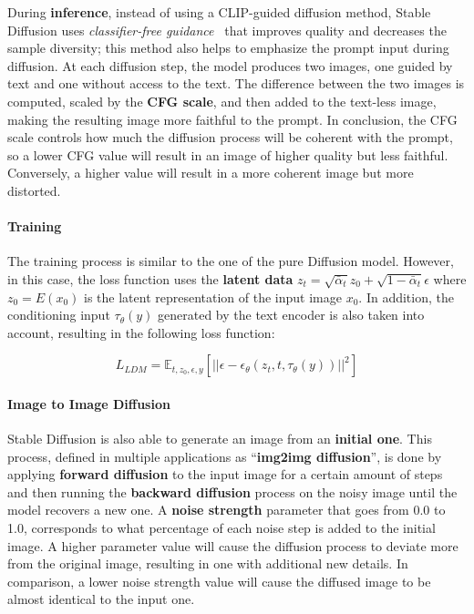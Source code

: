 \documentclass[preprint]{elsarticle}
\begin{document}
During \textbf{inference}, instead of using a CLIP-guided diffusion method, Stable Diffusion uses 
\emph{classifier-free guidance}~\cite{ho2022classifierfree} that improves quality and decreases the sample diversity;  this method also helps to emphasize the prompt input during diffusion. 
At each diffusion step, the model produces two images, one guided by text and one without access to the text.  The difference between the two images is computed, scaled by the \textbf{CFG scale}, and then added to the text-less image,  making the resulting image more faithful to the prompt. 
In conclusion, the CFG scale controls how much the diffusion process will be coherent with the prompt, so a lower CFG value will result in an image of higher quality but less faithful. Conversely, a higher value will result in a more coherent image but more distorted.


\paragraph{Training}

The training process is similar to the one of the pure Diffusion model.
However, in this case, the loss function uses the \textbf{latent data} $z_t=\sqrt{\bar{\alpha}_t}z_0 + \sqrt{1-\bar{\alpha}_t}\epsilon$ where $z_0 = E(x_0)$ is the latent representation of the input image $x_0$. In addition, the conditioning input $\tau_\theta(y)$ generated by the text encoder is also taken into account, resulting in the following loss function:

\begin{equation}
	L_{LDM} = \mathbb{E}_{t,z_0,\epsilon,y}\left[||\epsilon-\epsilon_\theta(z_t,t,\tau_\theta(y))||^2\right]
\end{equation}



\paragraph{Image to Image Diffusion}

Stable Diffusion is also able to generate an image from an \textbf{initial one}. This process, defined in multiple applications  as ``\textbf{img2img diffusion}'', is done by applying \textbf{forward diffusion} to the input image for a certain amount of steps and then running the \textbf{backward diffusion} process on the noisy image until the model recovers a new one. A \textbf{noise strength} parameter  that goes from 0.0 to 1.0, corresponds to what percentage of each noise step is added to the initial image. 
A higher parameter value will cause the diffusion process to deviate more from the original image, resulting in one with additional new details. In comparison, a lower noise strength value will cause the diffused image to be almost identical to the input one.
\end{document}
